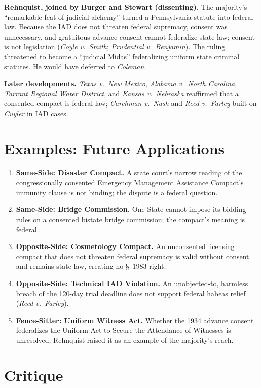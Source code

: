 \documentclass[12pt]{article}
\begin{document}
\textbf{Rehnquist, joined by Burger and Stewart (dissenting).} The majority's ``remarkable feat of judicial alchemy'' turned a Pennsylvania statute into federal law. Because the IAD does not threaten federal supremacy, consent was unnecessary, and gratuitous advance consent cannot federalize state law; consent is not legislation (\textit{Coyle v.\ Smith}; \textit{Prudential v.\ Benjamin}). The ruling threatened to become a ``judicial Midas'' federalizing uniform state criminal statutes. He would have deferred to \textit{Coleman}.

\textbf{Later developments.} \textit{Texas v.\ New Mexico}, \textit{Alabama v.\ North Carolina}, \textit{Tarrant Regional Water District}, and \textit{Kansas v.\ Nebraska} reaffirmed that a consented compact is federal law; \textit{Carchman v.\ Nash} and \textit{Reed v.\ Farley} built on \textit{Cuyler} in IAD cases.

\section{Examples: Future Applications}

\begin{enumerate}
\item \textbf{Same-Side: Disaster Compact.} A state court's narrow reading of the congressionally consented Emergency Management Assistance Compact's immunity clause is not binding; the dispute is a federal question.
\item \textbf{Same-Side: Bridge Commission.} One State cannot impose its bidding rules on a consented bistate bridge commission; the compact's meaning is federal.
\item \textbf{Opposite-Side: Cosmetology Compact.} An unconsented licensing compact that does not threaten federal supremacy is valid without consent and remains state law, creating no \S~1983 right.
\item \textbf{Opposite-Side: Technical IAD Violation.} An unobjected-to, harmless breach of the 120-day trial deadline does not support federal habeas relief (\textit{Reed v.\ Farley}).
\item \textbf{Fence-Sitter: Uniform Witness Act.} Whether the 1934 advance consent federalizes the Uniform Act to Secure the Attendance of Witnesses is unresolved; Rehnquist raised it as an example of the majority's reach.
\end{enumerate}

\section{Critique}
\end{document}
